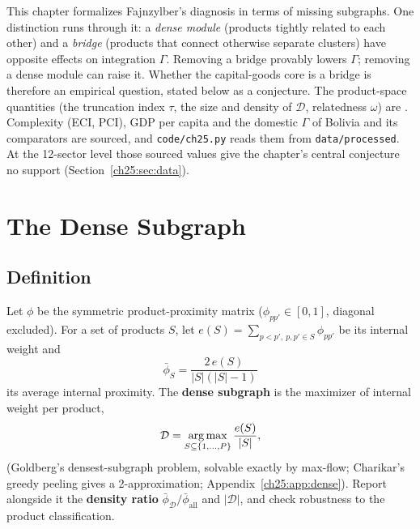 \documentclass[../structural_economics_book.tex]{subfiles}
\begin{document}
This chapter formalizes Fajnzylber's diagnosis in terms of missing subgraphs. One distinction runs through it: a \emph{dense module} (products tightly related to each other) and a \emph{bridge} (products that connect otherwise separate clusters) have opposite effects on integration $\Gamma$. Removing a bridge provably lowers $\Gamma$; removing a dense module can raise it. Whether the capital-goods core is a bridge is therefore an empirical question, stated below as a conjecture. The product-space quantities (the truncation index $\tau$, the size and density of $\mathcal{D}$, relatedness $\omega$) are \illustrative{}. Complexity (ECI, PCI), GDP per capita and the domestic $\Gamma$ of Bolivia and its comparators are sourced, and \texttt{code/ch25.py} reads them from \texttt{data/processed}. At the 12-sector level those sourced values give the chapter's central conjecture no support (Section~\ref{ch25:sec:data}).


\section{The Dense Subgraph}
\label{ch25:sec:dense}

\subsection{Definition}

\begin{definition}\label{ch25:def:dense}
Let $\phi$ be the symmetric product-proximity matrix ($\phi_{pp'} \in [0,1]$, diagonal excluded). For a set of products $S$, let $e(S) = \sum_{p < p',\ p,p' \in S}\phi_{pp'}$ be its internal weight and
\[
\bar{\phi}_S = \frac{2\,e(S)}{|S|(|S|-1)}
\]
its average internal proximity. The \textbf{dense subgraph} is the maximizer of internal weight per product,
\begin{equation}\label{ch25:eq:dense}
\mathcal{D} = \operatorname*{arg\,max}_{S \subseteq \{1, \ldots, P\}} \frac{e(S)}{|S|},
\end{equation}
(Goldberg's densest-subgraph problem, solvable exactly by max-flow; Charikar's greedy peeling gives a 2-approximation; Appendix~\ref{ch25:app:dense}). Report alongside it the \textbf{density ratio} $\bar{\phi}_{\mathcal{D}}/\bar{\phi}_{\text{all}}$ and $|\mathcal{D}|$, and check robustness to the product classification.
\end{definition}
\end{document}
